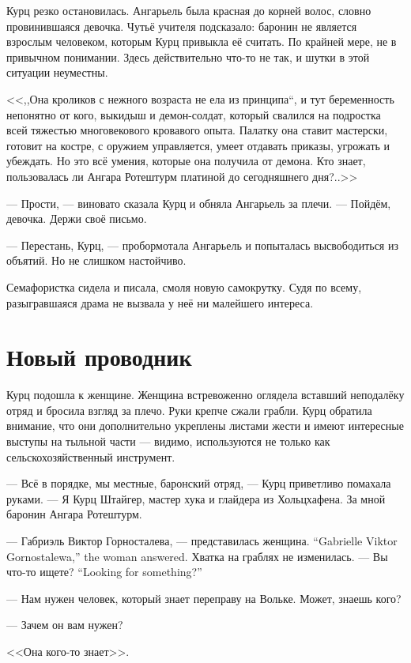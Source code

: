 Курц резко остановилась.
Ангарьель была красная до корней волос, словно провинившаяся девочка.
Чутьё учителя подсказало: баронин не является взрослым человеком, которым Курц привыкла её считать.
По крайней мере, не в привычном понимании.
Здесь действительно что-то не так, и шутки в этой ситуации неуместны.

<<,,Она кроликов с нежного возраста не ела из принципа``, и тут беременность непонятно от кого, выкидыш и демон-солдат, который свалился на подростка всей тяжестью многовекового кровавого опыта.
Палатку она ставит мастерски, готовит на костре, с оружием управляется, умеет отдавать приказы, угрожать и убеждать.
Но это всё умения, которые она получила от демона.
Кто знает, пользовалась ли Ангара Ротештурм платиной до сегодняшнего дня?..>>

--- Прости, --- виновато сказала Курц и обняла Ангарьель за плечи.
--- Пойдём, девочка.
Держи своё письмо.

--- Перестань, Курц, --- пробормотала Ангарьель и попыталась высвободиться из объятий.
Но не слишком настойчиво.

Семафористка сидела и писала, смоля новую самокрутку.
Судя по всему, разыгравшаяся драма не вызвала у неё ни малейшего интереса.

\section{Новый проводник}

Курц подошла к женщине.
Женщина встревоженно оглядела вставший неподалёку отряд и бросила взгляд за плечо.
Руки крепче сжали грабли.
Курц обратила внимание, что они дополнительно укреплены листами жести и имеют интересные выступы на тыльной части --- видимо, используются не только как сельскохозяйственный инструмент.

--- Всё в порядке, мы местные, баронский отряд, --- Курц приветливо помахала руками.
--- Я Курц Штайгер, мастер хука и глайдера из Хольцхафена.
За мной баронин Ангара Ротештурм.

{--- Габриэль Виктор Горносталева, --- представилась женщина.}
{``Gabrielle Viktor Gornostalewa,'' the woman answered.}
Хватка на граблях не изменилась.
{--- Вы что-то ищете?}
{``Looking for something?''}

--- Нам нужен человек, который знает переправу на Вольке.
Может, знаешь кого?

--- Зачем он вам нужен?

<<Она кого-то знает>>.

